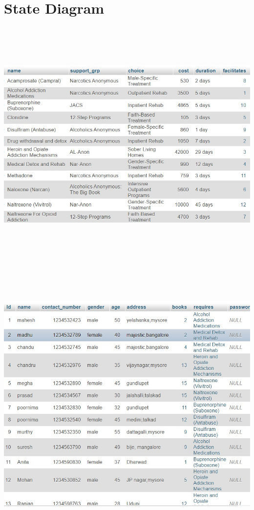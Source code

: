 \documentclass{report}
\begin{document}
\section{State Diagram}
\centerline{\includegraphics[width=7in,height=5in,keepaspectratio]{sd1}}\\
\centerline{\includegraphics[width=7in,height=5in,keepaspectratio]{sd2}}\\
\end{document}
